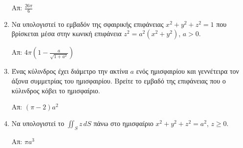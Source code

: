 \begin{enumerate}
\hfill Απ: $\frac{26\pi}{6}$

\item Να υπολογιστεί το εμβαδόν της σφαιρικής επιφάνειας $x^{2}+y^{2}+z^{2}=1$ που βρίσκεται μέσα στην κωνική επιφάνεια $z^{2}=a^{2}(x^{2}+y^{2})$, $a>0$.

\hfill Απ: $4\pi\left(1-\frac{a}{\sqrt{1+a^{2}}}\right)$

\item Ένας κύλινδρος έχει διάμετρο την ακτίνα $a$ ενός ημισφαιρίου και γεννέτειρα τον άξονα συμμετρίας του ημισφαιρίου. Βρείτε το εμβαδό της επιφάνειας που ο κύλινδρος κόβει το ημισφαίριο.

\hfill Απ: $(\pi-2)a^{2}$

\item Να υπολογιστεί το $\iint_{S}z\,dS$ πάνω στο ημισφαίριο $x^{2}+y^{2}+z^{2}=a^{2}$, $z\geq 0$.

\hfill Απ: $\pi a^{3}$

\end{enumerate}



